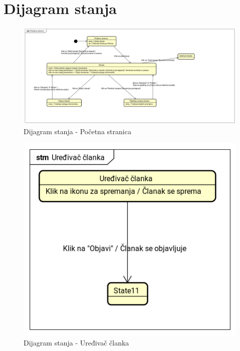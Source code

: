 \eject


\section{Dijagram stanja}

\begin{figure}[H]
	\includegraphics[scale=0.4]{slike/dijagrami-stanja/pocetna-stranica.png}
	\centering
	\caption{Dijagram stanja - Početna stranica}
	\label{fig:state_diagram_home}
\end{figure}

\begin{figure}[H]
	\includegraphics[scale=0.4]{slike/dijagrami-stanja/uredivac-clanka.png}
	\centering
	\caption{Dijagram stanja - Uređivač članka}
	\label{fig:state_diagram_editor}
\end{figure}

